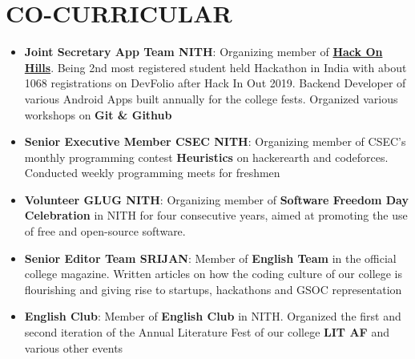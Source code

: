 \documentclass[a4paper,timesnewroman,11pt, twoside]{article}
\numberwithin{equation}{section}
\newcommand{\resumeItem}[2]{
  \item\small{
    \textbf{#1}{: #2 \vspace{-5pt}}
  }
}
\newcommand{\resumeSubItem}[2]{\resumeItem{#1}{#2}\vspace{-3pt}}
\newcommand{\resumeSubHeadingListStart}{\begin{itemize}[leftmargin=*]}
\newcommand{\resumeSubHeadingListEnd}{\end{itemize}}
\begin{document}
\section{CO-CURRICULAR}
  \resumeSubHeadingListStart
    \resumeSubItem{Joint Secretary App Team NITH}
      {Organizing member of \href{https://www.hackonhills.com/}{\textbf{Hack On Hills}}. Being 2nd most registered student held Hackathon in India with about 1068 registrations on DevFolio after Hack In Out 2019. Backend Developer of various Android Apps built annually for the college fests. Organized various workshops on \textbf{Git \& Github}}
    \resumeSubItem{Senior Executive Member CSEC NITH}
      {Organizing member of CSEC's monthly programming contest \textbf{Heuristics} on hackerearth and codeforces. Conducted weekly programming meets for freshmen}
    \resumeSubItem{Volunteer GLUG NITH}
      {Organizing member of \textbf{Software Freedom Day Celebration} in NITH for four consecutive years, aimed at promoting the use of free and open-source software.}
    \resumeSubItem{Senior Editor Team SRIJAN}
      {Member of \textbf{English Team} in the official college magazine. Written articles on how the coding culture of our college is flourishing and giving rise to startups, hackathons and GSOC representation}
    \resumeSubItem{English Club}
      {Member of \textbf{English Club} in NITH. Organized the first and second iteration of the Annual Literature Fest of our college \textbf{LIT AF} and various other events}
  \resumeSubHeadingListEnd
\end{document}
